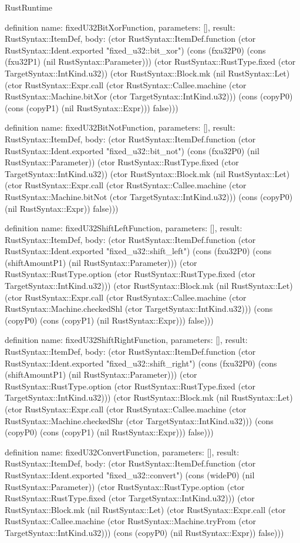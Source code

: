 \begin{lexlean}{RustRuntime}
\begin{semanticmodule}
definition{
  name: fixedU32BitXorFunction,
  parameters: [],
  result: RustSyntax::ItemDef,
  body: (ctor RustSyntax::ItemDef.function (ctor RustSyntax::Ident.exported "fixed_u32::bit_xor") (cons (fxu32P0) (cons (fxu32P1) (nil RustSyntax::Parameter))) (ctor RustSyntax::RustType.fixed (ctor TargetSyntax::IntKind.u32)) (ctor RustSyntax::Block.mk (nil RustSyntax::Let) (ctor RustSyntax::Expr.call (ctor RustSyntax::Callee.machine (ctor RustSyntax::Machine.bitXor (ctor TargetSyntax::IntKind.u32))) (cons (copyP0) (cons (copyP1) (nil RustSyntax::Expr))) false)))
}

definition{
  name: fixedU32BitNotFunction,
  parameters: [],
  result: RustSyntax::ItemDef,
  body: (ctor RustSyntax::ItemDef.function (ctor RustSyntax::Ident.exported "fixed_u32::bit_not") (cons (fxu32P0) (nil RustSyntax::Parameter)) (ctor RustSyntax::RustType.fixed (ctor TargetSyntax::IntKind.u32)) (ctor RustSyntax::Block.mk (nil RustSyntax::Let) (ctor RustSyntax::Expr.call (ctor RustSyntax::Callee.machine (ctor RustSyntax::Machine.bitNot (ctor TargetSyntax::IntKind.u32))) (cons (copyP0) (nil RustSyntax::Expr)) false)))
}

definition{
  name: fixedU32ShiftLeftFunction,
  parameters: [],
  result: RustSyntax::ItemDef,
  body: (ctor RustSyntax::ItemDef.function (ctor RustSyntax::Ident.exported "fixed_u32::shift_left") (cons (fxu32P0) (cons (shiftAmountP1) (nil RustSyntax::Parameter))) (ctor RustSyntax::RustType.option (ctor RustSyntax::RustType.fixed (ctor TargetSyntax::IntKind.u32))) (ctor RustSyntax::Block.mk (nil RustSyntax::Let) (ctor RustSyntax::Expr.call (ctor RustSyntax::Callee.machine (ctor RustSyntax::Machine.checkedShl (ctor TargetSyntax::IntKind.u32))) (cons (copyP0) (cons (copyP1) (nil RustSyntax::Expr))) false)))
}

definition{
  name: fixedU32ShiftRightFunction,
  parameters: [],
  result: RustSyntax::ItemDef,
  body: (ctor RustSyntax::ItemDef.function (ctor RustSyntax::Ident.exported "fixed_u32::shift_right") (cons (fxu32P0) (cons (shiftAmountP1) (nil RustSyntax::Parameter))) (ctor RustSyntax::RustType.option (ctor RustSyntax::RustType.fixed (ctor TargetSyntax::IntKind.u32))) (ctor RustSyntax::Block.mk (nil RustSyntax::Let) (ctor RustSyntax::Expr.call (ctor RustSyntax::Callee.machine (ctor RustSyntax::Machine.checkedShr (ctor TargetSyntax::IntKind.u32))) (cons (copyP0) (cons (copyP1) (nil RustSyntax::Expr))) false)))
}

definition{
  name: fixedU32ConvertFunction,
  parameters: [],
  result: RustSyntax::ItemDef,
  body: (ctor RustSyntax::ItemDef.function (ctor RustSyntax::Ident.exported "fixed_u32::convert") (cons (wideP0) (nil RustSyntax::Parameter)) (ctor RustSyntax::RustType.option (ctor RustSyntax::RustType.fixed (ctor TargetSyntax::IntKind.u32))) (ctor RustSyntax::Block.mk (nil RustSyntax::Let) (ctor RustSyntax::Expr.call (ctor RustSyntax::Callee.machine (ctor RustSyntax::Machine.tryFrom (ctor TargetSyntax::IntKind.u32))) (cons (copyP0) (nil RustSyntax::Expr)) false)))
}


\end{semanticmodule}
\end{lexlean}
